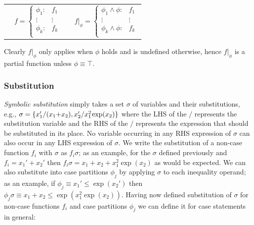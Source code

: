 \documentclass[twoside,11pt]{article}
\begin{document}
{%
\begin{center}
\begin{tabular}{r c c l}
&
\hspace{-6mm} 
  $f = \begin{cases}
    \phi_1: & f_1 \\ 
   \vdots&\vdots\\ 
    \phi_k: & f_k \\ 
  \end{cases}$
&

&
\hspace{-2mm}
  $f|_{\phi} = \begin{cases}
    \phi_1 \land \phi : & f_1 \\ 
   \vdots&\vdots\\ 
    \phi_k \land \phi : & f_k \\ 
  \end{cases}$
\end{tabular}
\end{center}
}
Clearly $f|_{\phi}$ only applies when $\phi$ holds and is
undefined otherwise, hence $f|_{\phi}$ is a partial function
unless $\phi \equiv \top$.

\subsubsection*{Substitution}
\emph{Symbolic substitution} simply takes
a set $\sigma$ of variables and their substitutions, e.g., 
$\sigma = \{ x_1' / (x_1 \hspace{-.8mm} + \hspace{-.8mm} x_2), x_2' / x_1^2 \hspace{-.3mm} \exp(x_2) \}$ where
the LHS of the $/$ represents the substitution variable and the
RHS of the $/$ represents 
the expression that should be substituted in its place.  No variable
occurring in any RHS expression of $\sigma$ can also occur in any 
LHS expression of $\sigma$.
We write the substitution of a non-case function $f_i$ with $\sigma$ 
as $f_i\sigma$; as an example, for the $\sigma$ defined previously and 
$f_i = x_1' + x_2'$ then $f_i\sigma = x_1 + x_2 + x_1^2 \exp(x_2)$ as
would be expected.  We can also substitute into case partitions $\phi_j$
by applying $\sigma$ to each inequality operand; as an example, if
$\phi_j \equiv x_1' \leq \exp(x_2')$ then 
$\phi_j \sigma \equiv x_1 + x_2 \leq \exp(x_1^2 \exp(x_2))$.
Having now defined substitution of $\sigma$ for non-case functions $f_i$ and case
partitions $\phi_j$ we can define it for case statements in general:
\end{document}
